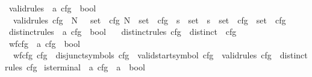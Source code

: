 \begin{isabellebody}
\isanewline
{}\isamarkupfalse%
\ valid{\isacharunderscore}{\kern0pt}rules\ {\isacharcolon}{\kern0pt}{\isacharcolon}{\kern0pt}\ {\isachardoublequoteopen}{\isacharprime}{\kern0pt}a\ cfg\ {\isasymRightarrow}\ bool{\isachardoublequoteclose}\ \isanewline
\ \ {\isachardoublequoteopen}valid{\isacharunderscore}{\kern0pt}rules\ cfg\ {\isasymlongleftrightarrow}\ {\isacharparenleft}{\kern0pt}{\isasymforall}{\isacharparenleft}{\kern0pt}N{\isacharcomma}{\kern0pt}\ {\isasymalpha}{\isacharparenright}{\kern0pt}\ {\isasymin}\ set\ {\isacharparenleft}{\kern0pt}{\isasymRR}\ cfg{\isacharparenright}{\kern0pt}{\isachardot}{\kern0pt}\ N\ {\isasymin}\ set\ {\isacharparenleft}{\kern0pt}{\isasymNN}\ cfg{\isacharparenright}{\kern0pt}\ {\isasymand}\ {\isacharparenleft}{\kern0pt}{\isasymforall}s\ {\isasymin}\ set\ {\isasymalpha}{\isachardot}{\kern0pt}\ s\ {\isasymin}\ set\ {\isacharparenleft}{\kern0pt}{\isasymNN}\ cfg{\isacharparenright}{\kern0pt}\ {\isasymunion}\ set\ {\isacharparenleft}{\kern0pt}{\isasymTT}\ cfg{\isacharparenright}{\kern0pt}{\isacharparenright}{\kern0pt}{\isacharparenright}{\kern0pt}{\isachardoublequoteclose}\isanewline
\isanewline
{}\isamarkupfalse%
\ distinct{\isacharunderscore}{\kern0pt}rules\ {\isacharcolon}{\kern0pt}{\isacharcolon}{\kern0pt}\ {\isachardoublequoteopen}{\isacharprime}{\kern0pt}a\ cfg\ {\isasymRightarrow}\ bool{\isachardoublequoteclose}\ \isanewline
\ \ {\isachardoublequoteopen}distinct{\isacharunderscore}{\kern0pt}rules\ cfg\ {\isacharequal}{\kern0pt}\ distinct\ {\isacharparenleft}{\kern0pt}{\isasymRR}\ cfg{\isacharparenright}{\kern0pt}{\isachardoublequoteclose}\isanewline
\isanewline
{}\isamarkupfalse%
\ wf{\isacharunderscore}{\kern0pt}cfg\ {\isacharcolon}{\kern0pt}{\isacharcolon}{\kern0pt}\ {\isachardoublequoteopen}{\isacharprime}{\kern0pt}a\ cfg\ {\isasymRightarrow}\ bool{\isachardoublequoteclose}\ \isanewline
\ \ {\isachardoublequoteopen}wf{\isacharunderscore}{\kern0pt}cfg\ cfg\ {\isasymlongleftrightarrow}\ disjunct{\isacharunderscore}{\kern0pt}symbols\ cfg\ {\isasymand}\ valid{\isacharunderscore}{\kern0pt}startsymbol\ cfg\ {\isasymand}\ valid{\isacharunderscore}{\kern0pt}rules\ cfg\ {\isasymand}\ distinct{\isacharunderscore}{\kern0pt}rules\ cfg{\isachardoublequoteclose}\isanewline
\isanewline
{}\isamarkupfalse%
\ is{\isacharunderscore}{\kern0pt}terminal\ {\isacharcolon}{\kern0pt}{\isacharcolon}{\kern0pt}\ {\isachardoublequoteopen}{\isacharprime}{\kern0pt}a\ cfg\ {\isasymRightarrow}\ {\isacharprime}{\kern0pt}a\ {\isasymRightarrow}\ bool{\isachardoublequoteclose}\ \isanewline

\end{isabellebody}
